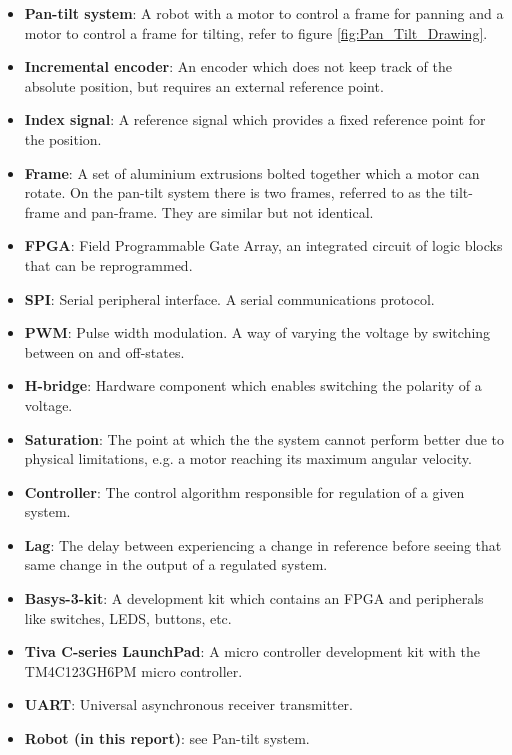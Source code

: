\documentclass[../../main.tex]{subfiles}
\begin{document}
\label{sec:wordlist}
\begin{itemize}
    \item \textbf{Pan-tilt system}: A robot with a motor to control a frame for panning and a motor to control a frame for tilting, refer to figure \ref{fig:Pan_Tilt_Drawing}.
    \item \textbf{Incremental encoder}: An encoder which does not keep track of the absolute position, but requires an external reference point.
    \item \textbf{Index signal}: A reference signal which provides a fixed reference point for the position.
    \item \textbf{Frame}: A set of aluminium extrusions bolted together which a motor can rotate. On the pan-tilt system there is two frames, referred to as the tilt-frame and pan-frame. They are similar but not identical.
    \item \textbf{FPGA}: Field Programmable Gate Array, an integrated circuit of logic blocks that can be reprogrammed.
    \item \textbf{SPI}: Serial peripheral interface. A serial communications protocol.
    \item \textbf{PWM}: Pulse width modulation. A way of varying the voltage by switching between on and off-states.
    \item \textbf{H-bridge}: Hardware component which enables switching the polarity of a voltage.
    \item \textbf{Saturation}: The point at which the the system cannot perform better due to physical limitations, e.g. a motor reaching its maximum angular velocity.
    \item \textbf{Controller}: The control algorithm responsible for regulation of a given system.
    \item \textbf{Lag}: The delay between experiencing a change in reference before seeing that same change in the output of a regulated system. 
    
    \item \textbf{Basys-3-kit}: A development kit which contains an FPGA and peripherals like switches, LEDS, buttons, etc.
    
    \item \textbf{Tiva C-series LaunchPad}: A micro controller development kit with the TM4C123GH6PM micro controller.
    
    
    \item \textbf{UART}: Universal asynchronous receiver transmitter.
    \item \textbf{Robot (in this report)}: see Pan-tilt system.
    

\end{itemize}
\end{document}
